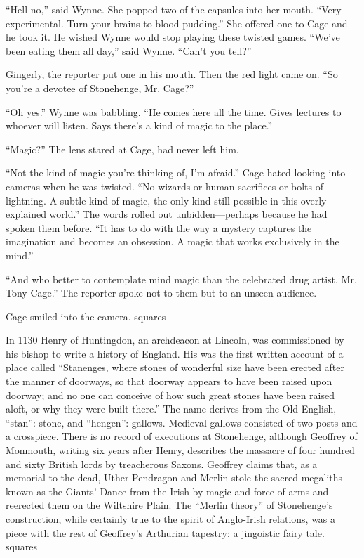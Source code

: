 “Hell no,” said Wynne. She popped two of the capsules into her mouth. “Very experimental. Turn your brains to blood pudding.” She offered one to Cage and he took it. He wished Wynne would stop playing these twisted games. “We’ve been eating them all day,” said Wynne. “Can’t you tell?”

Gingerly, the reporter put one in his mouth. Then the red light came on. “So you’re a devotee of Stonehenge, Mr. Cage?”

“Oh yes.” Wynne was babbling. “He comes here all the time. Gives lectures to whoever will listen. Says there’s a kind of magic to the place.”

“Magic?” The lens stared at Cage, had never left him.

“Not the kind of magic you’re thinking of, I’m afraid.” Cage hated looking into cameras when he was twisted. “No wizards or human sacrifices or bolts of lightning. A subtle kind of magic, the only kind still possible in this overly explained world.” The words rolled out unbidden—perhaps because he had spoken them before. “It has to do with the way a mystery captures the imagination and becomes an obsession. A magic that works exclusively in the mind.”

“And who better to contemplate mind magic than the celebrated drug artist, Mr. Tony Cage.” The reporter spoke not to them but to an unseen audience.

Cage smiled into the camera.
squares

In 1130 Henry of Huntingdon, an archdeacon at Lincoln, was commissioned by his bishop to write a history of England. His was the first written account of a place called “Stanenges, where stones of wonderful size have been erected after the manner of doorways, so that doorway appears to have been raised upon doorway; and no one can conceive of how such great stones have been raised aloft, or why they were built there.” The name derives from the Old English, “stan”: stone, and “hengen”: gallows. Medieval gallows consisted of two posts and a crosspiece. There is no record of executions at Stonehenge, although Geoffrey of Monmouth, writing six years after Henry, describes the massacre of four hundred and sixty British lords by treacherous Saxons. Geoffrey claims that, as a memorial to the dead, Uther Pendragon and Merlin stole the sacred megaliths known as the Giants’ Dance from the Irish by magic and force of arms and reerected them on the Wiltshire Plain. The “Merlin theory” of Stonehenge’s construction, while certainly true to the spirit of Anglo-Irish relations, was a piece with the rest of Geoffrey’s Arthurian tapestry: a jingoistic fairy tale.
squares


